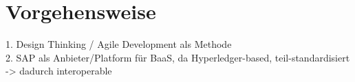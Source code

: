 \section{Vorgehensweise}
1. Design Thinking / Agile Development als Methode\\
2. SAP als Anbieter/Platform für BaaS, da Hyperledger-based, teil-standardisiert -> dadurch interoperable

\newpage
